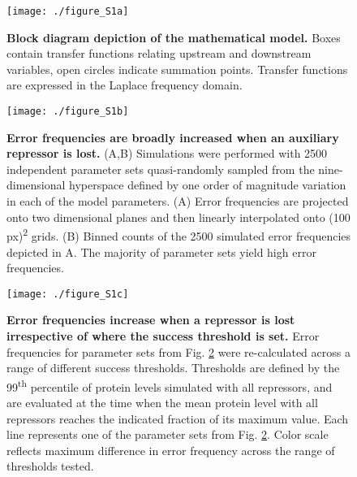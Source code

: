 \graphicspath{ {./figures/metabolism/} }



\begin{figure}[h!]
\label{fig:metabolism:figS1a}
\centering
\texttt{[image: ./figure\_S1a]}
\caption[Block diagram depiction of the mathematical model.]{\textbf{Block diagram depiction of the mathematical model.} Boxes contain transfer functions relating upstream and downstream variables, open circles indicate summation points. Transfer functions are expressed in the Laplace frequency domain.}
\end{figure}

\begin{figure}[h!]
\label{fig:metabolism:figS1b}
\centering
\texttt{[image: ./figure\_S1b]}
\caption[Error frequencies are broadly increased when an auxiliary repressor is lost.]{\textbf{Error frequencies are broadly increased when an auxiliary repressor is lost.} (A,B) Simulations were performed with 2500 independent parameter sets quasi-randomly sampled from the nine-dimensional hyperspace defined by one order of magnitude variation in each of the model parameters. (A) Error frequencies are projected onto two dimensional planes and then linearly interpolated onto (100 px)\textsuperscript{2} grids. (B) Binned counts of the 2500 simulated error frequencies depicted in A. The majority of parameter sets yield high error frequencies.}
\end{figure}

\begin{figure}[h!]
\label{fig:metabolism:figS1c}
\centering
\texttt{[image: ./figure\_S1c]}
\caption[Error frequencies increase when a repressor is lost irrespective of where the success threshold is set.]{\textbf{Error frequencies increase when a repressor is lost irrespective of where the success threshold is set.} Error frequencies for parameter sets from Fig. \ref{fig:metabolism:figS1b} were re-calculated across a range of different success thresholds. Thresholds are defined by the 99\textsuperscript{th} percentile of protein levels simulated with all repressors, and are evaluated at the time when the mean protein level with all repressors reaches the indicated fraction of its maximum value. Each line represents one of the parameter sets from Fig. \ref{fig:metabolism:figS1b}. Color scale reflects maximum difference in error frequency across the range of thresholds tested.}
\end{figure}

